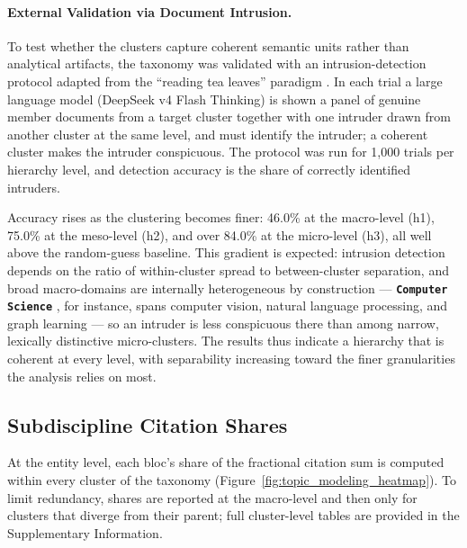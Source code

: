 \documentclass{article}
\let\cite\parencite
\begin{document}
	\paragraph{External Validation via Document Intrusion.}
	\label{intrusion_validation}
	
	To test whether the clusters capture coherent semantic units rather than analytical artifacts, the taxonomy was validated with an intrusion-detection protocol adapted from the ``reading tea leaves'' paradigm \cite{chang2009reading}. In each trial a large language model (DeepSeek v4 Flash Thinking) is shown a panel of genuine member documents from a target cluster together with one intruder drawn from another cluster at the same level, and must identify the intruder; a coherent cluster makes the intruder conspicuous. The protocol was run for 1,000 trials per hierarchy level, and detection accuracy is the share of correctly identified intruders.
	
	Accuracy rises as the clustering becomes finer: 46.0\% at the macro-level (h1), 75.0\% at the meso-level (h2), and over 84.0\% at the micro-level (h3), all well above the random-guess baseline. This gradient is expected: intrusion detection depends on the ratio of within-cluster spread to between-cluster separation, and broad macro-domains are internally heterogeneous by construction --- \textbf{\texttt{Computer Science}} , for instance, spans computer vision, natural language processing, and graph learning --- so an intruder is less conspicuous there than among narrow, lexically distinctive micro-clusters. The results thus indicate a hierarchy that is coherent at every level, with separability increasing toward the finer granularities the analysis relies on most.
	
	\subsection{Subdiscipline Citation Shares}
	
	At the entity level, each bloc's share of the fractional citation sum is computed within every cluster of the taxonomy (Figure~\ref{fig:topic_modeling_heatmap}). To limit redundancy, shares are reported at the macro-level and then only for clusters that diverge from their parent; full cluster-level tables are provided in the Supplementary Information.
	
\end{document}
